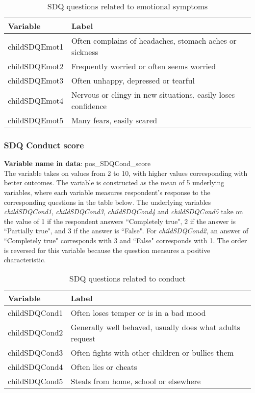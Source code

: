 \begin{table}[H]
\begin{center}
\footnotesize{
\caption{SDQ questions related to emotional symptoms}
\begin{tabular}{l l}
\hline
\textbf{Variable} & \textbf{Label} \\
\hline
childSDQEmot1 & Often complains of headaches, stomach-aches or sickness\\
childSDQEmot2 & Frequently worried or often seems worried\\
childSDQEmot3 & Often unhappy, depressed or tearful\\
childSDQEmot4 & Nervous or clingy in new situations, easily loses confidence\\
childSDQEmot5 & Many fears, easily scared\\
\hline
\end{tabular}
}
\end{center}
\end{table}

\subsubsection{SDQ Conduct score}
\textbf{Variable name in data}: pos\_SDQCond\_score \\[.3cm]
The variable takes on values from 2 to 10, with higher values corresponding with better outcomes. The variable is constructed as the mean of 5 underlying variables, where each variable measures respondent's response to the corresponding questions in the table below. The underlying variables \textit{childSDQCond1}, \textit{childSDQCond3}, \textit{childSDQCond4} and \textit{childSDQCond5} take on the value of 1 if the respondent answers  ``Completely true", 2 if the answer is ``Partially true", and 3 if the answer is ``False". For \textit{childSDQCond2}, an answer of ``Completely true" corresponds with 3 and ``False" corresponds with 1. The order is reversed for this variable because the question measures a positive characteristic. \\

\begin{table}[H]
\begin{center}
\footnotesize{
\caption{SDQ questions related to conduct}
\begin{tabular}{l l}
\hline
\textbf{Variable} & \textbf{Label} \\
\hline
childSDQCond1 & Often loses temper or is in a bad mood\\
childSDQCond2 &  Generally well behaved, usually does what adults request \\
childSDQCond3 & Often fights with other children or bullies them\\
childSDQCond4 & Often lies or cheats\\
childSDQCond5 & Steals from home, school or elsewhere\\
\hline
\end{tabular}
}
\end{center}
\end{table}


